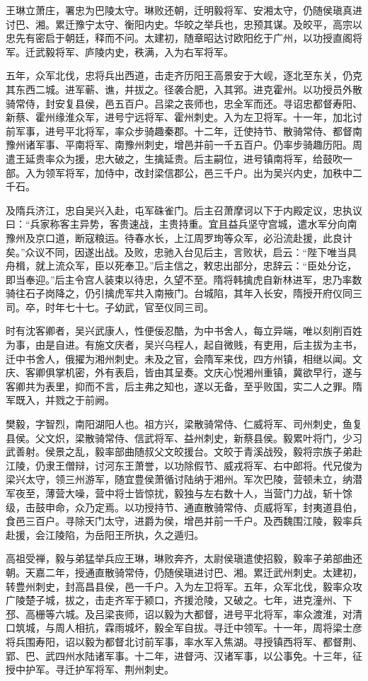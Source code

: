 \documentclass[]{article}
\begin{document}
王琳立萧庄，署忠为巴陵太守。琳败还朝，迁明毅将军、安湘太守，仍随侯瑱真进讨巴、湘。累迁豫宁太守、衡阳内史。华皎之举兵也，忠预其谋。及皎平，高宗以忠先有密启于朝廷，释而不问。太建初，随章昭达讨欧阳纥于广州，以功授直阁将军。迁武毅将军、庐陵内史，秩满，入为右军将军。

五年，众军北伐，忠将兵出西道，击走齐历阳王高景安于大岘，逐北至东关，仍克其东西二城。进军蕲、谯，并拔之。径袭合肥，入其郛。进克霍州。以功授员外散骑常侍，封安复县侯，邑五百户。吕梁之丧师也，忠全军而还。寻诏忠都督寿阳、新蔡、霍州缘淮众军，进号宁远将军、霍州刺史。入为左卫将军。十一年，加北讨前军事，进号平北将军，率众步骑趣秦郡。十二年，迁使持节、散骑常侍、都督南豫州诸军事、平南将军、南豫州刺史，增邑并前一千五百户。仍率步骑趣历阳。周遣王延贵率众为援，忠大破之，生擒延贵。后主嗣位，进号镇南将军，给鼓吹一部。入为领军将军，加侍中，改封梁信郡公，邑三千户。出为吴兴内史，加秩中二千石。

及隋兵济江，忠自吴兴入赴，屯军硃雀门。后主召萧摩诃以下于内殿定议，忠执议曰：``兵家称客主异势，客贵速战，主贵持重。宜且益兵坚守宫城，遣水军分向南豫州及京口道，断寇粮运。待春水长，上江周罗珣等众军，必沿流赴援，此良计矣。''众议不同，因遂出战。及败，忠驰入台见后主，言败状，启云：``陛下唯当具舟楫，就上流众军，臣以死奉卫。''后主信之，敕忠出部分，忠辞云：``臣处分讫，即当奉迎。''后主令宫人装束以待忠，久望不至。隋将韩擒虎自新林进军，忠乃率数骑往石子岗降之，仍引擒虎军共入南掖门。台城陷，其年入长安，隋授开府仪同三司。卒，时年七十七。子幼武，官至仪同三司。

时有沈客卿者，吴兴武康人，性便佞忍酷，为中书舍人，每立异端，唯以刻削百姓为事，由是自进。有施文庆者，吴兴乌程人，起自微贱，有吏用，后主拔为主书，迁中书舍人，俄擢为湘州刺史。未及之官，会隋军来伐，四方州镇，相继以闻。文庆、客卿俱掌机密，外有表启，皆由其呈奏。文庆心悦湘州重镇，冀欲早行，遂与客卿共为表里，抑而不言，后主弗之知也，遂以无备，至乎败国，实二人之罪。隋军既入，并戮之于前阙。

樊毅，字智烈，南阳湖阳人也。祖方兴，梁散骑常侍、仁威将军、司州刺史，鱼复县侯。父文炽，梁散骑常侍、信武将军、益州刺史，新蔡县侯。毅累叶将门，少习武善射。侯景之乱，毅率部曲随叔父文皎援台。文皎于青溪战殁，毅将宗族子弟赴江陵，仍隶王僧辩，讨河东王萧誉，以功除假节、威戎将军、右中郎将。代兄俊为梁兴太守，领三州游军，随宜豊侯萧循讨陆纳于湘州。军次巴陵，营顿未立，纳潜军夜至，薄营大噪，营中将士皆惊扰，毅独与左右数十人，当营门力战，斩十馀级，击鼓申命，众乃定焉。以功授持节、通直散骑常侍、贞威将军，封夷道县伯，食邑三百户。寻除天门太守，进爵为侯，增邑并前一千户。及西魏围江陵，毅率兵赴援，会江陵陷，为岳阳王所执，久之遁归。

高祖受禅，毅与弟猛举兵应王琳，琳败奔齐，太尉侯瑱遣使招毅，毅率子弟部曲还朝。天嘉二年，授通直散骑常侍，仍随侯瑱进讨巴、湘。累迁武州刺史。太建初，转豊州刺史，封高昌县侯，邑一千户。入为左卫将军。五年，众军北伐，毅率众攻广陵楚子城，拔之，击走齐军于颍口，齐援沧陵，又破之。七年，进克潼州、下邳、高栅等六城。及吕梁丧师，诏以毅为大都督，进号平北将军，率众渡淮，对清口筑城，与周人相抗，霖雨城坏，毅全军自拔。寻迁中领军。十一年，周将梁士彦将兵围寿阳，诏以毅为都督北讨前军事，率水军入焦湖。寻授镇西将军、都督荆、郢、巴、武四州水陆诸军事。十二年，进督沔、汉诸军事，以公事免。十三年，征授中护军。寻迁护军将军、荆州刺史。
\end{document}

